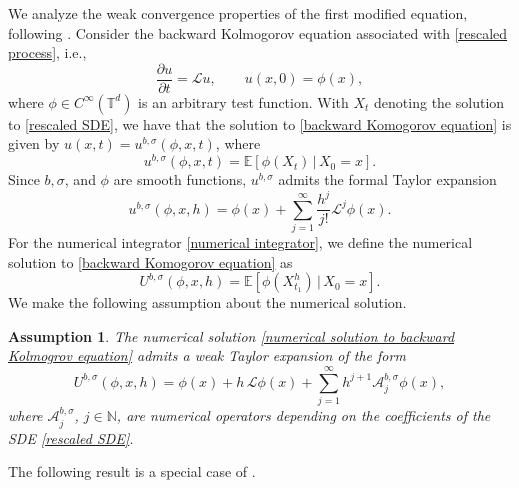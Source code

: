 \documentclass[12pt,a4paper,reqno]{amsart}
\newtheorem{assumption}{Assumption}
\numberwithin{equation}{section}
\begin{document}
We analyze the weak convergence properties of the first modified equation, following \cite{ACV12}. Consider the backward Kolmogorov equation associated with \eqref{rescaled process}, i.e.,
\begin{equation}\label{backward Komogorov equation}
    \frac{\partial u}{\partial t} = \mathcal{L}u, \qquad u(x,0) = \phi(x),
\end{equation}
where $\phi\in C^\infty(\mathbb{T}^d)$ is an arbitrary test function. With $X_t$ denoting the solution to \eqref{rescaled SDE}, we have that the solution to \eqref{backward Komogorov equation} is given by $u(x,t) = u^{b,\sigma}(\phi,x,t)$, where
\begin{equation*}
u^{b,\sigma}(\phi,x,t) = \mathbb{E}\left[\phi(X_t)\,|\,X_0 = x\right].
\end{equation*}
Since $b,\sigma$, and $\phi$ are smooth functions, $u^{b,\sigma}$ admits the formal Taylor expansion
\begin{equation*}
    u^{b,\sigma}(\phi,x,h) = \phi(x) + \sum_{j=1}^{\infty} \frac{h^j}{j!}\mathcal{L}^j\phi(x).
\end{equation*}
For the numerical integrator \eqref{numerical integrator}, we define the numerical solution to \eqref{backward Komogorov equation} as  
\begin{equation}\label{numerical solution to backward Kolmogrov equation}
	U^{b,\sigma}(\phi,x,h) = \mathbb{E}\left[\phi(X_{t_1}^h)\,|\,X_0 = x\right].
\end{equation}
We make the following assumption about the numerical solution.
\begin{assumption}\label{Assumption 1}
    The numerical solution \eqref{numerical solution to backward Kolmogrov equation} 
    admits a weak Taylor expansion of the form
    \begin{equation*}
    U^{b,\sigma}(\phi,x,h) = \phi(x) + h\, \mathcal{L}\phi(x)+ \sum_{j=1}^{\infty}h^{j+1}\mathcal{A}_j^{b,\sigma}\phi(x)        ,
    \end{equation*}
    where $\mathcal{A}_j^{b,\sigma}$, $j \in \mathbb{N}$, are numerical operators depending on the coefficients of the SDE \eqref{rescaled SDE}.
\end{assumption}
The following result is a special case of \cite[Theorem 2.1]{ACV12}.
\end{document}
